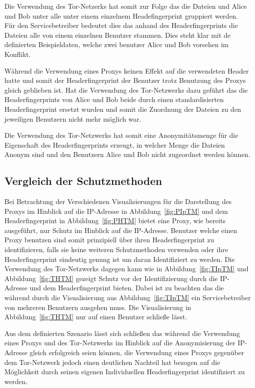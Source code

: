 \documentclass[
    fontsize=12pt,
    headings=small,
    parskip=half,           %
    bibliography=totoc,
    numbers=noenddot,       %
    open=any,               %
    ]{scrreprt}
\begin{document}
Die Verwendung des Tor-Netzerks hat somit zur Folge das die Dateien und Alice und Bob unter alle unter einem einzelnem Headefingerprint gruppiert werden. 
Für den Servicebetreiber bedeutet dies das anhand des Headerfingerprints die Dateien alle von einem einzelnen Benutzer stammen. 
Dies steht klar mit de definierten Beispieldaten, welche zwei benutzer Alice und Bob vorsehen im Konflikt.

Während die Verwendung eines Proxys keinen Effekt auf die verwendeten Header hatte und somit der Headerfingerprint der Benutzer trotz Benutzung des Proxys gleich geblieben ist. 
Hat die Verwendung des Tor-Netzwerks dazu geführt das die Headerfingerprints von Alice und Bob beide durch einen standardisierten Headerfingerprint ersetzt wurden und somit die Zuordnung der Dateien zu den jeweiligen Benutzern nicht mehr möglich war.

Die Verwendung des Tor-Netzwerks hat somit eine Anonymitätsmenge für die Eigenschaft des Headerfingerprints erzeugt, in welcher Menge die Dateien Anonym sind und den Benutzern Alice und Bob nicht zugeordnet werden können.


    \subsection{Vergleich der Schutzmethoden}
Bei Betrachtung der Verschiedenen Visualisierungen für die Darstellung des Proxys im Hinblick auf die IP-Adresse in Abbildung~\ref{fig:PIpTM} und dem Headerfingerprint in Abbildung~\ref{fig:PHTM} bietet eine Proxy, wie bereits ausgeführt, nur Schutz im Hinblick auf die IP-Adresse.
Benutzer welche einen Proxy benutzen sind somit prinzipiell über ihren Headerfingerprint zu identifizieren, falls sie keine weiteren Schutzmethoden verwenden oder ihre Headerfingerprint eindeutig genung ist um daran Identifiziert zu werden. 
Die Verwendung des Tor-Netzwerks dagegen kann wie in Abbildung~\ref{fig:TIpTM} und Abbildung~\ref{fig:THTM} gezeigt Schutz vor der Identifizierung durch die IP-Adresse und dem Headerfingerprint bieten.
Dabei ist zu beachten das die während durch die Visualisierung aus Abbildung~\ref{fig:TIpTM} ein Servicebetreiber von mehreren Benutzern ausgehen muss.
Die Visualisierung in Abbildung~\ref{fig:THTM} nur auf einen Benutzer schließe lässt.

Aus dem definierten Szenario lässt sich schließen das während die Verwendung eines Proxys und des Tor-Netzwerks im Hinblick auf die Anonymisierung der IP-Adresse gleich erfolgreich seien können, die Verwendung eines Proxys gegenüber dem Tor-Netzwerk jedoch einen deutlichen Nachteil hat bezogen auf die Möglichkeit durch seinen eigenen Individuellen Headerfingerprint identifiziert zu werden.
\end{document}

